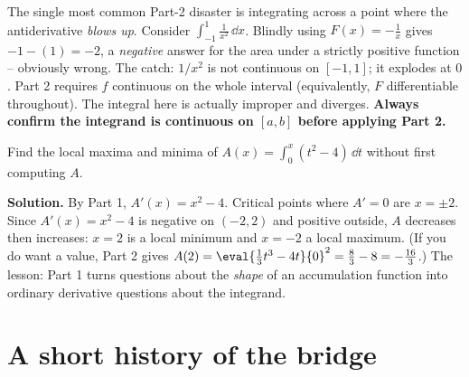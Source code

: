 \begin{trapbox}
The single most common Part-2 disaster is integrating across a point where the
antiderivative \emph{blows up}. Consider $\int_{-1}^{1}\frac{1}{x^2}\,\dd x$.
Blindly using $F(x)=-\tfrac1x$ gives $-1-(1)=-2$, a \emph{negative} answer for
the area under a strictly positive function -- obviously wrong. The catch: $1/x^2$
is not continuous on $[-1,1]$; it explodes at $0$. Part 2 requires $f$ continuous
on the whole interval (equivalently, $F$ differentiable throughout). The integral
here is actually improper and diverges. \textbf{Always confirm the integrand is
continuous on $[a,b]$ before applying Part 2.}
\end{trapbox}

\begin{example}\label{ch21:ex-both}
Find the local maxima and minima of $\displaystyle A(x)=\int_0^x (t^2-4)\,\dd t$
without first computing $A$.

\textbf{Solution.} By Part 1, $A'(x)=x^2-4$. Critical points where $A'=0$ are
$x=\pm 2$. Since $A'(x)=x^2-4$ is negative on $(-2,2)$ and positive outside, $A$
decreases then increases: $x=2$ is a local minimum and $x=-2$ a local maximum.
(If you do want a value, Part 2 gives
$A(2)=\eval{\tfrac13 t^3-4t}{0}^{2}=\tfrac{8}{3}-8=-\tfrac{16}{3}$.) The lesson:
Part 1 turns questions about the \emph{shape} of an accumulation function into
ordinary derivative questions about the integrand.
\end{example}

\section{A short history of the bridge}


